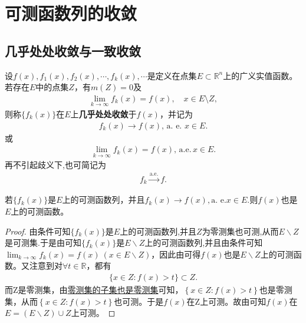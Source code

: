\documentclass[../../main.tex]{subfiles}
\begin{document}
\section{可测函数列的收敛}

\subsection{几乎处处收敛与一致收敛}

\begin{definition}[几乎处处收敛]
设$f(x), f_1(x), f_2(x), \cdots, f_k(x), \cdots$是定义在点集$E \subset \mathbb{R}^n$上的广义实值函数。若存在$E$中的点集$Z$，有$m(Z) = 0$及
\begin{align*}
\lim_{k \to \infty} f_k(x) = f(x), \quad x \in E \setminus Z,
\end{align*}
则称$\{f_k(x)\}$在$E$上\textbf{几乎处处收敛}于$f(x)$，并记为
\begin{align*}
f_k(x) \to f(x),\,\text{a. e. } x \in E.
\end{align*}
或
\begin{align*}
\lim_{k \to \infty} f_k(x) = f(x),\,\text{a.e.}\, x \in E.
\end{align*}
再不引起歧义下,也可简记为
\begin{align*}
f_k\xrightarrow{\mathrm{a}.\mathrm{e}.}f.
\end{align*}
\end{definition}

\begin{theorem}
若$\{f_k(x)\}$是$E$上的可测函数列，并且$f_k(x) \to f(x),\text{a. e.} x \in E.$则$f(x)$也是$E$上的可测函数。
\end{theorem}
\begin{proof}
由条件可知\(\{ f_k(x) \}\)是\(E\)上的可测函数列,并且$Z$为零测集也可测,从而\(E\backslash Z\)是可测集.于是由可知\(\{ f_k(x) \}\)是\(E\backslash Z\)上的可测函数列,并且由条件可知\(\lim_{k\rightarrow \infty}f_k(x) =f(x) \ (x\in E\backslash Z)\)，因此由可得\(f(x)\)也是\(E\backslash Z\)上的可测函数。又注意到对\(\forall t\in \mathbb{R}\)，都有
\begin{align*}
\{ x\in Z:f (x) >t \} \subset Z.
\end{align*}
而Z是零测集，由\hyperref[proposition:零测集的基本性质]{零测集的子集也是零测集}可知，\(\left\{ x\in Z:f(x) >t \right\}\)也是零测集，从而\(\left\{ x\in Z:f(x) >t \right\}\)也可测。于是\(f(x)\)在Z上可测。故由可知\(f(x)\)在\(E=(E\backslash Z)\cup Z\)上可测。
\end{proof}
\end{document}
